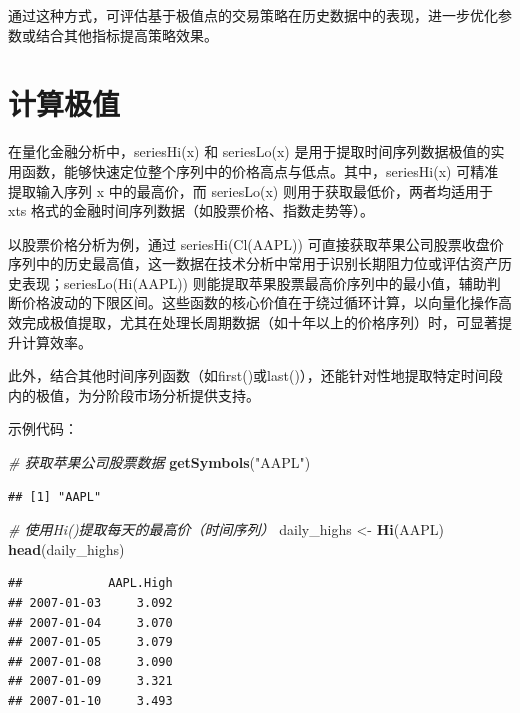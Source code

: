 \documentclass[]{ctexbook}
\newenvironment{Shaded}{\begin{snugshade}}{\end{snugshade}}
\newcommand{\CommentTok}[1]{\textcolor[rgb]{0.56,0.35,0.01}{\textit{#1}}}
\newcommand{\FunctionTok}[1]{\textcolor[rgb]{0.13,0.29,0.53}{\textbf{#1}}}
\newcommand{\NormalTok}[1]{#1}
\newcommand{\OtherTok}[1]{\textcolor[rgb]{0.56,0.35,0.01}{#1}}
\newcommand{\StringTok}[1]{\textcolor[rgb]{0.31,0.60,0.02}{#1}}
\begin{document}
通过这种方式，可评估基于极值点的交易策略在历史数据中的表现，进一步优化参数或结合其他指标提高策略效果。

\section{计算极值}\label{ux8ba1ux7b97ux6781ux503c}

在量化金融分析中，seriesHi(x) 和 seriesLo(x) 是用于提取时间序列数据极值的实用函数，能够快速定位整个序列中的价格高点与低点。其中，seriesHi(x) 可精准提取输入序列 x 中的最高价，而 seriesLo(x) 则用于获取最低价，两者均适用于 xts 格式的金融时间序列数据（如股票价格、指数走势等）。

以股票价格分析为例，通过 seriesHi(Cl(AAPL)) 可直接获取苹果公司股票收盘价序列中的历史最高值，这一数据在技术分析中常用于识别长期阻力位或评估资产历史表现；seriesLo(Hi(AAPL)) 则能提取苹果股票最高价序列中的最小值，辅助判断价格波动的下限区间。这些函数的核心价值在于绕过循环计算，以向量化操作高效完成极值提取，尤其在处理长周期数据（如十年以上的价格序列）时，可显著提升计算效率。

此外，结合其他时间序列函数（如first()或last()），还能针对性地提取特定时间段内的极值，为分阶段市场分析提供支持。

示例代码：

\begin{Shaded}
\begin{Highlighting}[]
\CommentTok{\# 获取苹果公司股票数据}
\FunctionTok{getSymbols}\NormalTok{(}\StringTok{"AAPL"}\NormalTok{)}
\end{Highlighting}
\end{Shaded}

\begin{verbatim}
## [1] "AAPL"
\end{verbatim}

\begin{Shaded}
\begin{Highlighting}[]
\CommentTok{\# 使用Hi()提取每天的最高价（时间序列）}
\NormalTok{daily\_highs }\OtherTok{\textless{}{-}} \FunctionTok{Hi}\NormalTok{(AAPL)}
\FunctionTok{head}\NormalTok{(daily\_highs)}
\end{Highlighting}
\end{Shaded}

\begin{verbatim}
##            AAPL.High
## 2007-01-03     3.092
## 2007-01-04     3.070
## 2007-01-05     3.079
## 2007-01-08     3.090
## 2007-01-09     3.321
## 2007-01-10     3.493
\end{verbatim}
\end{document}
